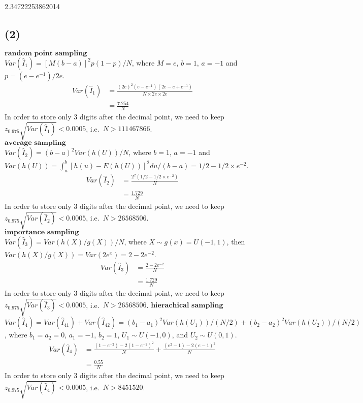 \documentclass[11pt]{article}
\begin{document}
    2.34722253862014

    
    \hypertarget{section}{%
\subsection{(2)}\label{section}}

    \(\textbf{random point sampling}\)\\
\(Var(\hat{I}_1)=[M(b-a)]^2p(1-p)/N\), where \(M=e\), \(b=1\), \(a=-1\)
and \(p=(e-e^{-1})/2e\). \[\begin{align}
    Var(\hat{I}_1)&=\frac{(2e)^2(e-e^{-1})(2e-e+e^{-1})}{N\times 2e\times 2e} \\
    &=\frac{7.254}{N}
\end{align}\] In order to store only 3 digits after the decimal point,
we need to keep \(z_{0.975}\sqrt{Var(\hat{I}_1)}<0.0005\),
i.e.~\(N>111467866\).\\
\(\textbf{average sampling}\)\\
\(Var(\hat{I}_2)=(b-a)^2Var(h(U))/N\), where \(b=1\), \(a=-1\) and
\(Var(h(U))=\int_a^b [h(u)-E(h(U))]^2du/(b-a)=1/2-1/2\times e^{-2}\).
\[\begin{align}
    Var(\hat{I}_2)&=\frac{2^2(1/2-1/2\times e^{-2})}{N} \\
    &=\frac{1.729}{N}
\end{align}\] In order to store only 3 digits after the decimal point,
we need to keep \(z_{0.975}\sqrt{Var(\hat{I}_2)}<0.0005\),
i.e.~\(N>26568506\).\\
\(\textbf{importance sampling}\)\\
\(Var(\hat{I}_3)=Var(h(X)/g(X))/N\), where \(X\sim g(x)=U(-1,1)\), then
\(Var(h(X)/g(X))=Var(2e^x)=2-2e^{-2}\). \[\begin{align}
    Var(\hat{I}_3)&=\frac{2-2e^{-2}}{N} \\
    &=\frac{1.729}{N}
\end{align}\] In order to store only 3 digits after the decimal point,
we need to keep \(z_{0.975}\sqrt{Var(\hat{I}_3)}<0.0005\),
i.e.~\(N>26568506\). \(\textbf{hierachical sampling}\)\\
\(Var(\hat{I}_4)=Var(\hat{I}_{41})+Var(\hat{I}_{42})=(b_1-a_1)^2Var(h(U_1))/(N/2)+(b_2-a_2)^2Var(h(U_2))/(N/2)\),
where \(b_1=a_2=0\), \(a_1=-1\), \(b_2=1\), \(U_1\sim U(-1,0)\), and
\(U_2\sim U(0,1)\). \[\begin{align}
    Var(\hat{I}_4)&=\frac{(1-e^{-2})-2(1-e^{-1})^2}{N}+\frac{(e^2-1)-2(e-1)^2}{N} \\
    &=\frac{0.55}{N}
\end{align}\] In order to store only 3 digits after the decimal point,
we need to keep \(z_{0.975}\sqrt{Var(\hat{I}_4)}<0.0005\),
i.e.~\(N>8451520\).
\end{document}
